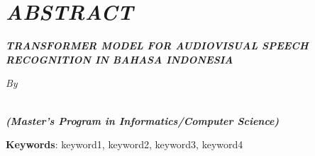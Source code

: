 \clearpage
\chapter*{\textit{ABSTRACT}}

\begin{center}
	\begin{spacing}{1}
    \Large \bfseries \textit{\MakeUppercase{Transformer Model For Audiovisual Speech Recognition in Bahasa Indonesia}}
    \end{spacing}
    
    \Large \textit{By} \\
    \begin{spacing}{1}
		\bfseries \Large \theauthor \\
		\textit{(Master's Program in Informatics/Computer Science)}
    \end{spacing}
\end{center}

\begin{spacing}{1}
	{\itshape
		\blindtext

		\blindtext
		
		\textbf{Keywords}: keyword1, keyword2, keyword3, keyword4
	}
\end{spacing}
\clearpage